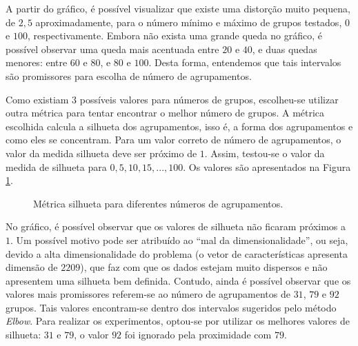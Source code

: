 \documentclass[conference]{IEEEtran}
\begin{document}
A partir do gráfico, é possível visualizar que existe uma distorção muito pequena, de $2,5$ aproximadamente, para o número mínimo e máximo de grupos testados, $0$ e $100$, respectivamente. Embora não exista uma grande queda no gráfico, é possível observar uma queda mais acentuada entre $20$ e $40$, e duas quedas menores: entre $60$ e $80$, e $80$ e $100$. Desta forma, entendemos que tais intervalos são promissores para escolha de número de agrupamentos.

Como existiam 3 possíveis valores para números de grupos, escolheu-se utilizar outra métrica para tentar encontrar o melhor número de grupos. A métrica escolhida calcula a silhueta dos agrupamentos, isso é, a forma dos agrupamentos e como eles se concentram. Para um valor correto de número de agrupamentos, o valor da medida silhueta deve ser próximo de $1$. Assim, testou-se o valor da medida de silhueta para $0, 5, 10, 15, ..., 100$. Os valores são apresentados na Figura \ref{fig:silhueta}.

\begin{figure}[!h]
	\centering
	{
	}
	\caption{\small Métrica silhueta para diferentes números de agrupamentos.}
	\label{fig:silhueta}
\end{figure}

No gráfico, é possível observar que os valores de silhueta não ficaram próximos a $1$. Um possível motivo pode ser atribuído ao ``mal da dimensionalidade'', ou seja, devido a alta dimensionalidade do problema (o vetor de características apresenta dimensão de $2209$), que faz com que os dados estejam muito dispersos e não apresentem uma silhueta bem definida. Contudo, ainda é possível observar que os valores mais promissores referem-se ao número de agrupamentos de $31$, $79$ e $92$ grupos. Tais valores encontram-se dentro dos intervalos sugeridos pelo método \textit{Elbow}. Para realizar os experimentos, optou-se por utilizar os melhores valores de silhueta: $31$ e $79$, o valor $92$ foi ignorado pela proximidade com $79$.
\end{document}
